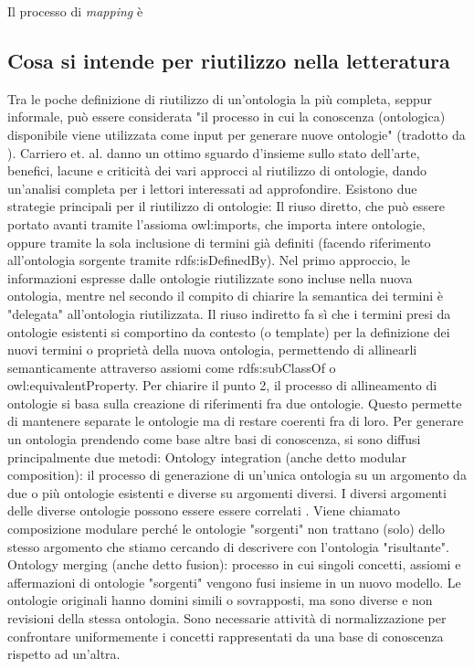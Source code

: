 Il processo di \textit{mapping} è 

\bvv

\subsection{Cosa si intende per riutilizzo nella letteratura}
Tra le poche definizione di riutilizzo di un'ontologia la più completa, seppur informale, può essere considerata "il processo in cui la conoscenza (ontologica) disponibile viene utilizzata come input per generare nuove ontologie" (tradotto da \cite{...}). Carriero et. al. \cite{...} danno un ottimo sguardo d'insieme sullo stato dell'arte, benefici, lacune e criticità dei vari approcci al riutilizzo di ontologie, dando un'analisi completa per i lettori interessati ad approfondire.
Esistono due strategie principali per il riutilizzo di ontologie: 
Il riuso diretto, che può essere portato avanti tramite l'assioma owl:imports, che importa intere ontologie, oppure tramite la sola inclusione di termini già definiti (facendo riferimento all'ontologia sorgente tramite rdfs:isDefinedBy). Nel primo approccio, le informazioni espresse dalle ontologie riutilizzate sono incluse nella nuova ontologia, mentre nel secondo il compito di chiarire la semantica dei termini è "delegata" all'ontologia riutilizzata.
Il riuso indiretto fa sì che i termini presi da ontologie esistenti si comportino da contesto (o template) per la definizione dei nuovi termini o proprietà della nuova ontologia, permettendo di allinearli semanticamente attraverso assiomi come rdfs:subClassOf o owl:equivalentProperty.
Per chiarire il punto 2, il processo di allineamento di ontologie si basa sulla creazione di riferimenti fra due ontologie. Questo permette di mantenere separate le ontologie ma di restare coerenti fra di loro. \cite{...}
Per generare un ontologia prendendo come base altre basi di conoscenza, si sono diffusi principalmente due metodi:
Ontology integration (anche detto modular composition): il processo di generazione di un'unica ontologia su un argomento da due o più ontologie esistenti e diverse su argomenti diversi. I diversi argomenti delle diverse ontologie possono essere essere correlati \cite{...}. Viene chiamato composizione modulare perché le ontologie "sorgenti" non trattano (solo) dello stesso argomento che stiamo cercando di descrivere con l'ontologia "risultante".
Ontology merging (anche detto fusion): processo in cui singoli concetti, assiomi e affermazioni di ontologie "sorgenti" vengono fusi insieme in un nuovo modello. Le ontologie originali hanno domini simili o sovrapposti, ma sono diverse e non revisioni della stessa ontologia. Sono necessarie attività di normalizzazione per confrontare uniformemente i concetti rappresentati da una base di conoscenza rispetto ad un'altra. \cite{.., ..}
